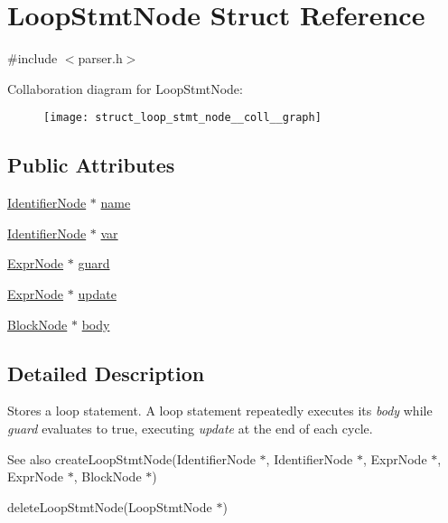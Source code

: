 \hypertarget{struct_loop_stmt_node}{\section{Loop\-Stmt\-Node Struct Reference}
\label{struct_loop_stmt_node}
}


{\ttfamily \#include $<$parser.\-h$>$}



Collaboration diagram for Loop\-Stmt\-Node\-:
\nopagebreak
\begin{figure}[H]
\begin{center}
\leavevmode
\texttt{[image: struct\_loop\_stmt\_node\_\_coll\_\_graph]}
\end{center}
\end{figure}
\subsection*{Public Attributes}
\begin{DoxyCompactItemize}
\item 
\hyperlink{struct_identifier_node}{Identifier\-Node} $\ast$ \hyperlink{struct_loop_stmt_node_a36b401d6c4fd2c16a68de026b99187f3}{name}
\item 
\hyperlink{struct_identifier_node}{Identifier\-Node} $\ast$ \hyperlink{struct_loop_stmt_node_afb3820072966231fd1d43eea8ebd9234}{var}
\item 
\hyperlink{struct_expr_node}{Expr\-Node} $\ast$ \hyperlink{struct_loop_stmt_node_a53a86fb7f989cf43f54192b8f3ad6c1a}{guard}
\item 
\hyperlink{struct_expr_node}{Expr\-Node} $\ast$ \hyperlink{struct_loop_stmt_node_a0400ab555fff51b09f79c495af20f37f}{update}
\item 
\hyperlink{struct_block_node}{Block\-Node} $\ast$ \hyperlink{struct_loop_stmt_node_a6844fd9206ed5d6b4fd48fc1365969aa}{body}
\end{DoxyCompactItemize}


\subsection{Detailed Description}
Stores a loop statement. A loop statement repeatedly executes its {\itshape body\/} while {\itshape guard\/} evaluates to true, executing {\itshape update\/} at the end of each cycle.

\begin{DoxySeeAlso}{See also}
create\-Loop\-Stmt\-Node(\-Identifier\-Node $\ast$, Identifier\-Node $\ast$, Expr\-Node $\ast$, Expr\-Node $\ast$, Block\-Node $\ast$) 

delete\-Loop\-Stmt\-Node(\-Loop\-Stmt\-Node $\ast$) 
\end{DoxySeeAlso}


